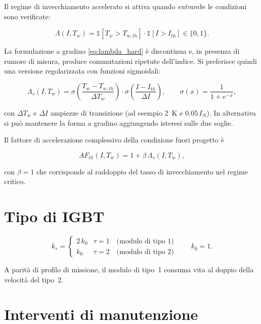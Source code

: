 \documentclass[11pt,a4paper]{article}
\begin{document}
Il regime di invecchiamento accelerato si attiva quando \emph{entrambe} le
condizioni sono verificate:

\begin{equation}
  \Lambda(I,T_w) =
  \mathbb{1}\!\left[T_w > T_{w,th}\right]\cdot
  \mathbb{1}\!\left[I > I_{th}\right] \in \{0,1\}.
  \label{eq:lambda_hard}
\end{equation}

La formulazione a gradino \eqref{eq:lambda_hard} è discontinua e, in presenza di
rumore di misura, produce commutazioni ripetute dell'indice. Si preferisce
quindi una versione regolarizzata con funzioni sigmoidali:

\begin{equation}
  \Lambda_s(I,T_w) =
  \sigma\!\left(\frac{T_w - T_{w,th}}{\Delta T_w}\right)\cdot
  \sigma\!\left(\frac{I - I_{th}}{\Delta I}\right),
  \qquad
  \sigma(x) = \frac{1}{1+e^{-x}} ,
  \label{eq:lambda_soft}
\end{equation}

con $\Delta T_w$ e $\Delta I$ ampiezze di transizione (ad esempio
\SI{2}{\kelvin} e $0.05\,I_N$). In alternativa si può mantenere la forma a
gradino aggiungendo isteresi sulle due soglie.

Il fattore di accelerazione complessivo della condizione fuori progetto è

\begin{equation}
  AF_{th}(I,T_w) = 1 + \beta\,\Lambda_s(I,T_w),
\end{equation}

con $\beta = 1$ che corrisponde al raddoppio del tasso di invecchiamento nel
regime critico.

\section{Tipo di IGBT}

\begin{equation}
  k_\tau =
  \begin{cases}
    2\,k_0 & \tau = 1 \quad \text{(modulo di tipo 1)}\\[2pt]
    k_0    & \tau = 2 \quad \text{(modulo di tipo 2)}
  \end{cases}
  \qquad k_0 = 1 .
  \label{eq:tipo}
\end{equation}

A parità di profilo di missione, il modulo di tipo~1 consuma vita al doppio
della velocità del tipo~2.

\section{Interventi di manutenzione}
\end{document}
